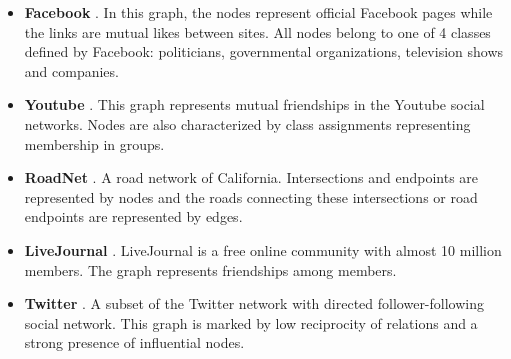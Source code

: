 \documentclass{IEEEtran}
\begin{document}
\begin{itemize}
    \item \textbf{Facebook} \cite{rozemberczki2019multiscale}. In this graph, the nodes represent official Facebook pages while the links are mutual likes between sites. All nodes belong to one of 4 classes defined by Facebook: politicians, governmental organizations, television shows and companies.
    \item \textbf{Youtube} \cite{mislove-2007-socialnetworks}. This graph represents mutual friendships in the Youtube social networks. Nodes are also characterized by class assignments representing membership in groups.
    \item \textbf{RoadNet} \cite{community-structure}. A road network of California. Intersections and endpoints are represented by nodes and the roads connecting these intersections or road endpoints are represented by edges.
    \item \textbf{LiveJournal} \cite{10.1145/1150402.1150412}. LiveJournal is a free online community with almost 10 million members. The graph represents friendships among members.
    \item \textbf{Twitter} \cite{Kwak10www}. A subset of the Twitter network with directed follower-following social network. This graph is marked by low reciprocity of relations and a strong presence of influential nodes.
\end{itemize}
\end{document}
